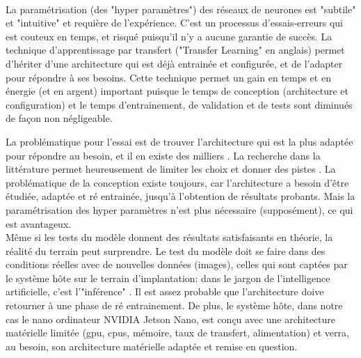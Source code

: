 \vspace{\baselineskip}
\\
\noindent La paramétrisation (des "hyper paramètres") des réseaux de neurones est "subtile" et "intuitive" et requière de l'expérience. C'est un processus d'essais-erreurs qui est couteux en temps, et risqué puisqu'il n'y a aucune garantie de succès. La technique d'apprentissage par transfert ("Transfer Learning" en anglais) permet d'hériter d'une architecture qui est déjà entrainée et configurée, et de l'adapter pour répondre à ses besoins. Cette technique permet un gain en temps et en énergie (et en argent) important puisque le temps de conception (architecture et configuration) et le temps d'entrainement, de validation et de tests sont diminués de façon non négligeable.
\begin{comment}
Par exemple l'architecture "VGG" prend 2-3 semaines d'entrainement \parencite{simonyan_very_2015} avec 4 \acrshort{gpu} Titan Black (NVIDIA), coutant 1,200 \$US (Amazon.com) chacun (pour un total de 4,800\$US, et cela juste pour les \acrshort{gpu}s, qui ne sont qu'un des éléments de l'infrastructure nécessaire). Étant donné que de multiples tentatives sont nécessaires (cycles essai-erreur), la stratégie est d'entrainer plusieurs modèles en parallèle afin d'accélérer le développement, ce qui implique un coût élevé en infrastructure.
\end{comment}
La problématique pour l'essai est de trouver l'architecture qui est la plus adaptée pour répondre au besoin, et il en existe des milliers \parencite{koh_model_2018}. La recherche dans la littérature permet heureusement de limiter les choix et donner des pistes \parencite{zheng_real-time_2020, nguyen_mavnet_2019, nvidia_jetson_2019-1}. La problématique de la conception existe toujours, car l'architecture a besoin d'être étudiée, adaptée et ré entrainée, jusqu'à l'obtention de résultats probants. Mais la paramétrisation des hyper paramètres n'est plus nécessaire (supposément), ce qui est avantageux.
\vspace{\baselineskip}
\\
\noindent Même si les tests du modèle donnent des résultats satisfaisants en théorie, la réalité du terrain peut surprendre. Le test du modèle doit se faire dans des conditions réelles avec de nouvelles données (images), celles qui sont captées par le système hôte sur le terrain d'implantation: dans le jargon de l'intelligence artificielle, c'est l'"inférence" \parencite{copel_whats_2016, nvidia_jetson_2019-1}. Il est assez probable que l'architecture doive retourner à une phase de ré entrainement. De plus, le système hôte, dans notre cas le nano ordinateur NVIDIA Jetson Nano, est conçu avec une architecture matérielle limitée (\acrshort{gpu}, \acrshort{cpu}s, mémoire, taux de transfert, alimentation) et verra, au besoin, son architecture matérielle adaptée et remise en question.